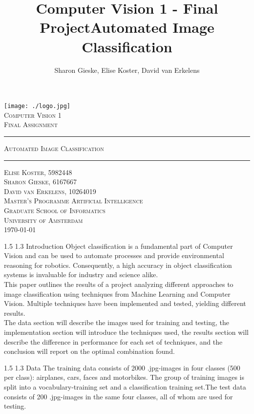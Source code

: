 \documentclass[12pt,a4paper]{amsart}
\title{Computer Vision 1 - Final Project}
\author{
Sharon Gieske, Elise Koster, David van Erkelens
}
\title{Automated Image Classification}
\date{}
\makeatletter
\def\section{%
  \@startsection{section}{1}{\z@}%
  {1.5\linespacing\@plus\linespacing}%
  {1.3\linespacing}%
  {\bfseries\normalfont\scshape}
}
\makeatother
\begin{document}
\begin{titlepage}
\begin{center}
    \texttt{[image: ./logo.jpg]}
    \\ [2.5cm]
    \textsc{\Large Computer Vision 1}
    \\ [0.5cm]
    \textsc{\large Final Assignment}
    \\ [1cm]
    \hrule
    \vspace{0.3cm}
    \textsc{Automated Image Classification}
    \\ [0.3cm]
    \hrule
    \vfill
    \textsc{Elise Koster, 5982448 \\ Sharon Gieske, 6167667 \\ David van Erkelens, 10264019 \\[0.7cm] Master's Programme Artificial Intelligence \\Graduate School of Informatics \\ University of Amsterdam \\[0.4cm] \today}
\end{center}
\end{titlepage}

\section{Introduction}
Object classification is a fundamental part of Computer Vision and can be used to automate processes and provide environmental reasoning for robotics. Consequently, a high accuracy in object classification systems is invaluable for industry and science alike.\\
This paper outlines the results of a project analyzing different approaches to image classification using techniques from Machine Learning and Computer Vision. Multiple techniques have been implemented and tested, yielding different results.\\
The data section will describe the images used for training and testing, the implementation section will introduce the techniques used, the results section will describe the difference in performance for each set of techniques, and the conclusion will report on the optimal combination found.

\section{Data}
The training data consists of 2000 .jpg-images in four classes (500 per class): airplanes, cars, faces and motorbikes. The group of training images is split into a vocabulary-training set and a classification training set.The test data consists of 200 .jpg-images in the same four classes, all of whom are used for testing.
\end{document}
